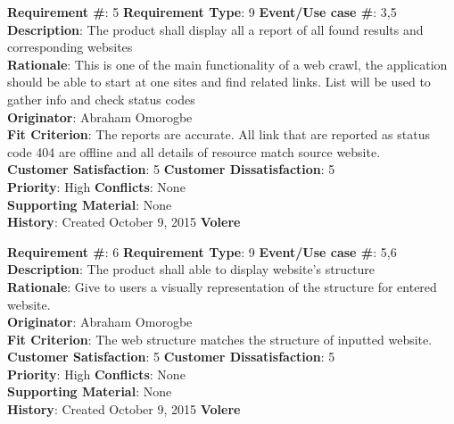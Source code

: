 \documentclass[titlepage]{article}
\begin{document}
\begin{framed}
\textbf{Requirement \#}: 5 \hfill \textbf{Requirement Type}: 9 \hfill\textbf{Event/Use case \#}: 3,5 \hfill\\
\textbf{Description}:  The product shall display all a report of all found results and corresponding websites\\
\textbf{Rationale}: This is one of the main functionality of a web crawl, the application should be able to start at one sites and find related links. List will be used to gather info and check status codes	\\
\textbf{Originator}: Abraham Omorogbe\\
\textbf{Fit Criterion}: The reports are accurate. All link that are reported as status code 404 are offline and all details of resource match source website.\\
\textbf{Customer Satisfaction}: 5 \hfill 	\textbf{Customer Dissatisfaction}: 5 \hfill\\
\textbf{Priority}: High \hfill \textbf{Conflicts}: None \hfill 		\\
\textbf{Supporting Material}: None\\
\textbf{History}: Created October 9, 2015 \hfill	 \textbf{Volere}\hfill

\end{framed}

\begin{framed}
\textbf{Requirement \#}: 6 \hfill \textbf{Requirement Type}: 9 \hfill\textbf{Event/Use case \#}: 5,6 \hfill\\
\textbf{Description}:  The product shall able to display website’s structure\\
\textbf{Rationale}: Give to users a visually representation of the structure for entered website.\\
\textbf{Originator}: Abraham Omorogbe\\
\textbf{Fit Criterion}: The web structure matches the structure of inputted website.	\\
\textbf{Customer Satisfaction}: 5 \hfill 	\textbf{Customer Dissatisfaction}: 5 \hfill\\
\textbf{Priority}: High \hfill \textbf{Conflicts}: None \hfill 		\\
\textbf{Supporting Material}: None\\
\textbf{History}: Created October 9, 2015 \hfill	 \textbf{Volere}\hfill

\end{framed}
\end{document}
